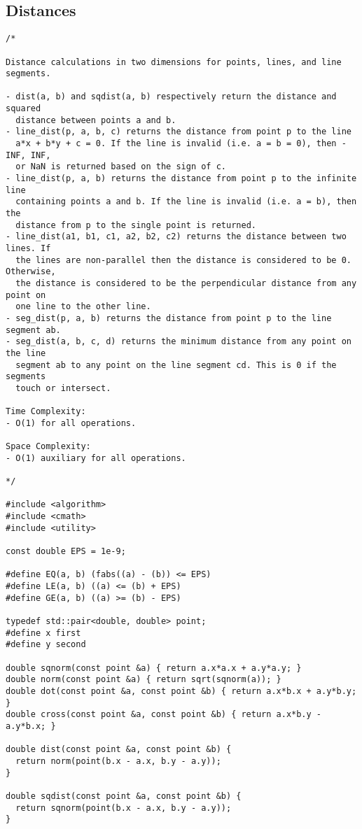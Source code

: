 \subsection{Distances}
\begin{lstlisting}
/*

Distance calculations in two dimensions for points, lines, and line segments.

- dist(a, b) and sqdist(a, b) respectively return the distance and squared
  distance between points a and b.
- line_dist(p, a, b, c) returns the distance from point p to the line
  a*x + b*y + c = 0. If the line is invalid (i.e. a = b = 0), then -INF, INF,
  or NaN is returned based on the sign of c.
- line_dist(p, a, b) returns the distance from point p to the infinite line
  containing points a and b. If the line is invalid (i.e. a = b), then the
  distance from p to the single point is returned.
- line_dist(a1, b1, c1, a2, b2, c2) returns the distance between two lines. If
  the lines are non-parallel then the distance is considered to be 0. Otherwise,
  the distance is considered to be the perpendicular distance from any point on
  one line to the other line.
- seg_dist(p, a, b) returns the distance from point p to the line segment ab.
- seg_dist(a, b, c, d) returns the minimum distance from any point on the line
  segment ab to any point on the line segment cd. This is 0 if the segments
  touch or intersect.

Time Complexity:
- O(1) for all operations.

Space Complexity:
- O(1) auxiliary for all operations.

*/

#include <algorithm>
#include <cmath>
#include <utility>

const double EPS = 1e-9;

#define EQ(a, b) (fabs((a) - (b)) <= EPS)
#define LE(a, b) ((a) <= (b) + EPS)
#define GE(a, b) ((a) >= (b) - EPS)

typedef std::pair<double, double> point;
#define x first
#define y second

double sqnorm(const point &a) { return a.x*a.x + a.y*a.y; }
double norm(const point &a) { return sqrt(sqnorm(a)); }
double dot(const point &a, const point &b) { return a.x*b.x + a.y*b.y; }
double cross(const point &a, const point &b) { return a.x*b.y - a.y*b.x; }

double dist(const point &a, const point &b) {
  return norm(point(b.x - a.x, b.y - a.y));
}

double sqdist(const point &a, const point &b) {
  return sqnorm(point(b.x - a.x, b.y - a.y));
}


\end{lstlisting}
